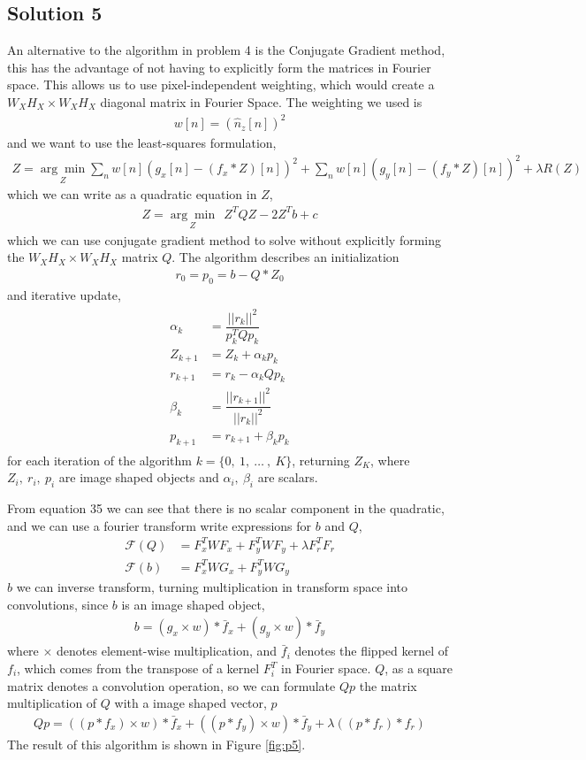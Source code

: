 \documentclass{article}
\newcommand{\solution}[1]{\clearpage \subsection*{Solution #1}}
\begin{document}
\solution{5} An alternative to the algorithm in problem 4 is the Conjugate Gradient method, this has the advantage of not having to explicitly form the matrices in Fourier space. This allows us to use pixel-independent weighting, which would create a $W_X H_X \times W_X H_X$ diagonal matrix in Fourier Space. The weighting we used is 
\begin{align}
	w[n] = (\hat{n}_z[n])^2
\end{align}
and we want to use the least-squares formulation,
\begin{align}
	Z = \underset{Z}{\arg \min} \sum_n w[n](g_x[n]-(f_x*Z)[n])^2 + \sum_n w[n](g_y[n]-(f_y*Z)[n])^2 + \lambda R(Z)
\end{align}
which we can write as a quadratic equation in $Z$,
\begin{align}
	Z = \underset{Z}{\arg \min}\ \  Z^TQZ-2Z^Tb+c
\end{align}
which we can use conjugate gradient method to solve without explicitly forming the $W_X H_X \times W_X H_X$ matrix $Q$. The algorithm describes an initialization
\begin{align}
		r_0 = p_0 = b-Q*Z_0 
\end{align}
and iterative update,
\begin{align}
	\begin{split}
		\alpha_k &= \dfrac{||r_k||^2}{p_k^TQp_k}\\
		Z_{k+1} &= Z_k + \alpha_kp_k\\
		r_{k+1} &= r_k - \alpha_kQp_k\\
		\beta_k &= \dfrac{||r_{k+1}||^2}{||r_k||^2} \\
		p_{k+1} &= r_{k+1} + \beta_kp_k
	\end{split}
\end{align}
for each iteration of the algorithm $k=\{0,\ 1,\ \dots\ ,\ K\}$, returning $Z_K$, where $Z_i,\ r_i,\ p_i$ are image shaped objects and $\alpha_i,\ \beta_i$ are scalars.

From equation 35 we can see that there is no scalar component in the quadratic, and we can use a fourier transform write expressions for $b$ and $Q$,
\begin{align}
	\mathcal{F}(Q) &= F_x^TWF_x + F_y^TWF_y+\lambda F_r^TF_r \\
	\mathcal{F}(b) &= F_x^TWG_x+F_y^TWG_y
\end{align}
$b$ we can inverse transform, turning multiplication in transform space into convolutions, since $b$ is an image shaped object,
\begin{align}
	b = (g_x \times w)*\bar{f}_x + (g_y \times w)*\bar{f}_y
\end{align}
where $\times$ denotes element-wise multiplication, and $\bar{f}_i$ denotes the flipped kernel of $f_i$, which comes from the transpose of a kernel $F_i^T$ in Fourier space. $Q$, as a square matrix denotes a convolution operation, so we can formulate $Qp$ the matrix multiplication of $Q$ with a image shaped vector, $p$
\begin{align}
	Qp = ((p*f_x)\times w)*\bar{f}_x + ((p*f_y)\times w)*\bar{f}_y + \lambda((p*f_r)*f_r)
\end{align}
The result of this algorithm is shown in Figure \ref{fig:p5}. 
\end{document}
